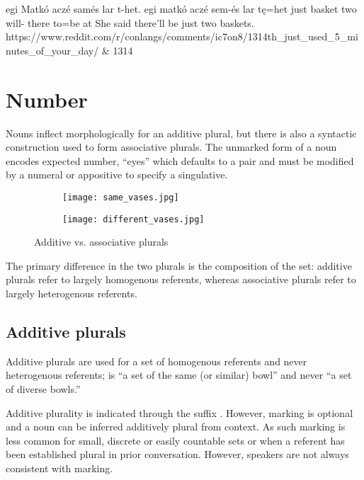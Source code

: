 \begin{examples*}
    \ex \label{ex:indirect_evidence}
        \script egi Matkó aczé samés lar t-het.
        \bits egi matkó aczé sem-és lar tę=het
        \gloss just basket\tbs{} two\tbs{} will- there to={be at}
        \tr She said there'll be just two baskets.
        \smoyd https://www.reddit.com/r/conlangs/comments/ic7on8/1314th_just_used_5_minutes_of_your_day/ & 1314
\end{examples*}

\section{Number}
Nouns inflect morphologically for an additive plural, but there is also a syntactic construction used to form associative plurals. The unmarked form of a noun encodes expected number, \eg {} “eyes” which defaults to a pair and must be modified by a numeral or appositive to specify a singulative. 

\begin{figure}[h]
    \centering
    \begin{subfigure}{0.4\textwidth}
        \centering
        \texttt{[image: same\_vases.jpg]}
        \caption{}
    \end{subfigure}
    \begin{subfigure}{0.4\textwidth}
        \centering
        \texttt{[image: different\_vases.jpg]}
        \caption{}
    \end{subfigure}
    \caption{Additive vs. associative plurals}
\end{figure}

The primary difference in the two plurals is the composition of the set: additive plurals refer to largely homogenous referents, whereas associative plurals refer to largely heterogenous referents.

\subsection{Additive plurals} \label{subsec:additive_plural}
Additive plurals are used for a set of homogenous referents and never heterogenous referents; \eg {} is “a set of the same (or similar) bowl” and never “a set of diverse bowls.”

Additive plurality is indicated through the suffix . However, marking is optional and a noun can be inferred additively plural from context.  As such marking is less common for small, discrete or easily countable sets or when a referent has been established plural in prior conversation. However, speakers are not always consistent with marking.

